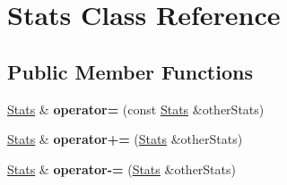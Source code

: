 \hypertarget{class_stats}{}\section{Stats Class Reference}
\label{class_stats}
\subsection*{Public Member Functions}
\begin{DoxyCompactItemize}
\item 
\hyperlink{class_stats}{Stats} \& {\bfseries operator=} (const \hyperlink{class_stats}{Stats} \&other\+Stats)\hypertarget{class_stats_aa5280e8bf1b444db40be5bb60c9b01e6}{}\label{class_stats_aa5280e8bf1b444db40be5bb60c9b01e6}

\item 
\hyperlink{class_stats}{Stats} \& {\bfseries operator+=} (\hyperlink{class_stats}{Stats} \&other\+Stats)\hypertarget{class_stats_a0890eeb3b2229555659f704bfbc378c5}{}\label{class_stats_a0890eeb3b2229555659f704bfbc378c5}

\item 
\hyperlink{class_stats}{Stats} \& {\bfseries operator-\/=} (\hyperlink{class_stats}{Stats} \&other\+Stats)\hypertarget{class_stats_a35e77c6b74e5101803333539c4d5ce52}{}\label{class_stats_a35e77c6b74e5101803333539c4d5ce52}


\end{DoxyCompactItemize}
